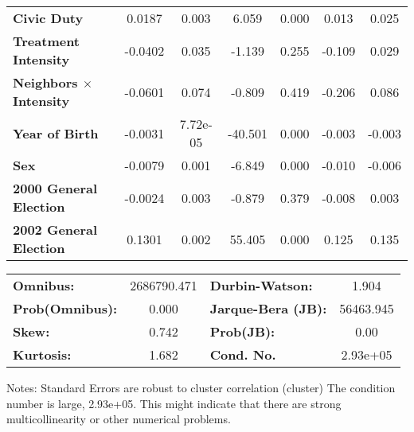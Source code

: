 \begin{center}
\begin{tabular}{lcccccc}
\textbf{Civic Duty}                    &       0.0187  &        0.003     &     6.059  &         0.000        &        0.013    &        0.025     \\
\textbf{Treatment Intensity}                      &      -0.0402  &        0.035     &    -1.139  &         0.255        &       -0.109    &        0.029     \\
\textbf{Neighbors $\times$ Intensity} &      -0.0601  &        0.074     &    -0.809  &         0.419        &       -0.206    &        0.086     \\
\textbf{Year of Birth}                                       &      -0.0031  &     7.72e-05     &   -40.501  &         0.000        &       -0.003    &       -0.003     \\
\textbf{Sex}                                       &      -0.0079  &        0.001     &    -6.849  &         0.000        &       -0.010    &       -0.006     \\
\textbf{2000 General Election}                                     &      -0.0024  &        0.003     &    -0.879  &         0.379        &       -0.008    &        0.003     \\
\textbf{2002 General Election}                                     &       0.1301  &        0.002     &    55.405  &         0.000        &        0.125    &        0.135     \\
\bottomrule
\end{tabular}
\begin{tabular}{lclc}
\textbf{Omnibus:}       & 2686790.471 & \textbf{  Durbin-Watson:     } &     1.904  \\
\textbf{Prob(Omnibus):} &     0.000   & \textbf{  Jarque-Bera (JB):  } & 56463.945  \\
\textbf{Skew:}          &     0.742   & \textbf{  Prob(JB):          } &      0.00  \\
\textbf{Kurtosis:}      &     1.682   & \textbf{  Cond. No.          } &  2.93e+05  \\
\bottomrule
\end{tabular}
\end{center}

Notes: \newline
 [1] Standard Errors are robust to cluster correlation (cluster) \newline
 [2] The condition number is large, 2.93e+05. This might indicate that there are \newline
 strong multicollinearity or other numerical problems.